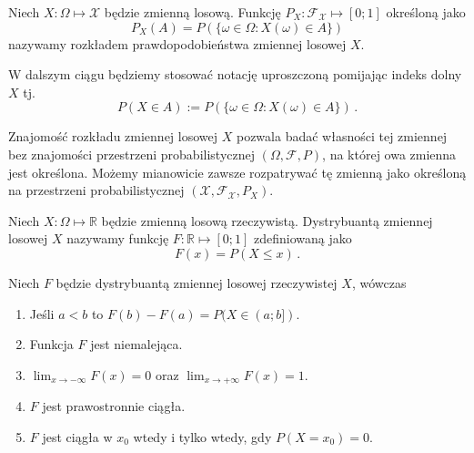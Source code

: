 \documentclass{myclass}
\numberwithin{equation}{subsection}
\begin{document}
\begin{definition}
Niech \(X: \Omega \mapsto \mathcal{X}\) będzie zmienną losową. Funkcję \(P_X:
\mathcal{F}_\mathcal{X}\mapsto [0;1]\) określoną jako
\begin{equation*}
    P_X(A) = P(\{\omega \in \Omega : X(\omega) \in A\})
\end{equation*}
nazywamy rozkładem prawdopodobieństwa zmiennej losowej \(X\).
\end{definition}

W dalszym ciągu będziemy stosować notację uproszczoną pomijając indeks dolny \(X\) tj.
\begin{equation*}
    P(X \in A) := P(\{\omega \in \Omega : X(\omega) \in A\})\,.
\end{equation*}

Znajomość rozkładu zmiennej losowej \(X\) pozwala badać własności tej zmiennej bez znajomości
przestrzeni probabilistycznej \((\Omega, \mathcal{F}, P)\), na której owa zmienna jest określona.
Możemy mianowicie zawsze rozpatrywać tę zmienną jako określoną na przestrzeni probabilistycznej
\((\mathcal{X}, \mathcal{F}_\mathcal{X}, P_X)\).

\begin{definition}
Niech \(X: \Omega \mapsto \mathbb{R}\) będzie zmienną losową rzeczywistą. Dystrybuantą zmiennej
losowej \(X\) nazywamy funkcję \(F: \mathbb{R} \mapsto [0;1]\) zdefiniowaną jako
\begin{equation*}
    F(x) = P(X \leq x)\,.
\end{equation*}
\end{definition}

\begin{theorem}
Niech \(F\) będzie dystrybuantą zmiennej losowej rzeczywistej \(X\), wówczas
\begin{enumerate}
    
    \item Jeśli \(a < b\) to \(F(b) - F(a) = P(X \in (a;b] )\).
    
    \item Funkcja \(F\) jest niemalejąca.

    \item \(\lim_{x \to -\infty} F(x) = 0\) oraz \(\lim_{x \to +\infty} F(x) = 1\).

    \item \(F\) jest prawostronnie ciągła.

    \item \(F\) jest ciągła w \(x_0\) wtedy i tylko wtedy, gdy \(P(X = x_0) = 0\).

\end{enumerate}
\end{theorem}
\end{document}

